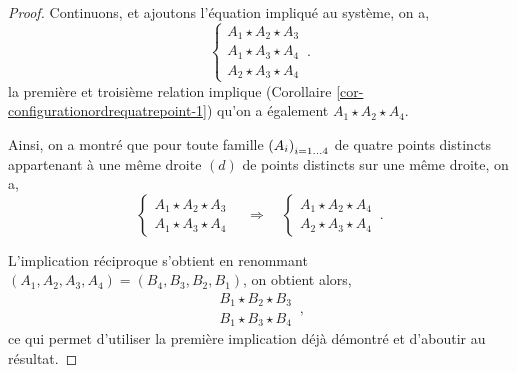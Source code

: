 \begin{cor}
\begin{proof}
        Continuons, et ajoutons l'équation impliqué au système, on a,
        \begin{equation*}
        \left\{
            \begin{array}{c}
                 A_1 \star A_2 \star A_3 \\
                 A_1 \star A_3 \star A_4 \\
                 A_2 \star A_3 \star A_4 
            \end{array}
            \right. \,.
        \end{equation*}
        la première et troisième relation implique (Corollaire \ref{cor-configurationordrequatrepoint-1}) qu'on a également $A_1 \star A_2 \star A_4$. 

        Ainsi, on a montré que pour toute famille $\left(A_{i}\right)_{i = 1\ldots 4}$ de quatre points distincts appartenant à une même droite $(d)$ de points distincts sur une même droite, on a,
            \begin{equation*}
        \left\{
            \begin{array}{c}
                 A_1 \star A_2 \star A_3 \\
                 A_1 \star A_3 \star A_4
            \end{array}
            \right. \quad \Longrightarrow \quad \left\{
            \begin{array}{c}
                A_1 \star A_2 \star A_4\\
                A_2 \star A_3 \star A_4
            \end{array}
            \right.
            \,.
    \end{equation*}

    L'implication réciproque s'obtient en renommant $(A_1,A_2,A_3,A_4)=(B_4,B_3,B_2,B_1)$, on obtient alors,
    \begin{equation*}
        \begin{array}{c}
                 B_1 \star B_2 \star B_3 \\
                 B_1 \star B_3 \star B_4
            \end{array}\,,
    \end{equation*}
    ce qui permet d'utiliser la première implication déjà démontré et d'aboutir au résultat.
    \end{proof}
\end{cor}
